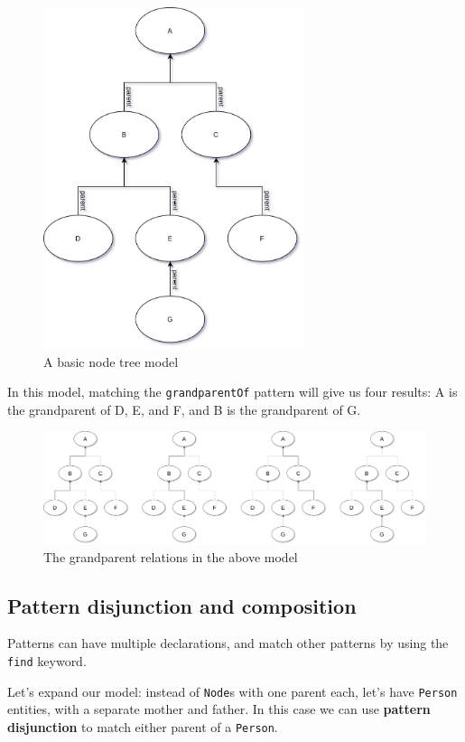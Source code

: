 \documentclass[11pt,a4paper,oneside]{report}
\begin{document}
\begin{figure}[!htbp]
\centering
\includegraphics[height=100mm, keepaspectratio]{figures/basic-eval-explanation-1.png}
\caption{A basic node tree model}
\label{fig:basic-eval-explanation-1}
\end{figure}

In this model, matching the \texttt{grandparentOf} pattern will give us four
results: A is the grandparent of D, E, and F, and B is the grandparent of G.

\begin{figure}[!htbp]
\centering
\includegraphics[width=150mm, keepaspectratio]{figures/basic-eval-explanation-2.png}
\caption{The grandparent relations in the above model}
\label{fig:basic-eval-explanation-2}
\end{figure}

\subsection{Pattern disjunction and composition}
Patterns can have multiple declarations, and match other patterns by using the
\texttt{find} keyword.

Let's expand our model: instead of \texttt{Node}s with one parent each, let's
have \texttt{Person} entities, with a separate mother and father. In this case
we can use \textbf{pattern disjunction} to match either parent of a
\texttt{Person}.
\end{document}

